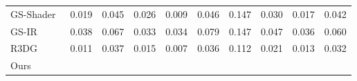 \begin{table*}
{\begin{tabular}{lccccccccc}
GS-Shader~\cite{jiang2024gaussianshader}    & 0.019                     & \cellcolor{yzythird}0.045                     & 0.026             &0.009                   & 0.046                         & 0.147                   & 0.030                      & 0.017    &  0.042                       \\

GS-IR~\cite{liang2024gs} & 0.038 & 0.067 & 0.033 & 0.034 & 0.079 & 0.147 & 0.047 & 0.036  & 0.060 \\

R3DG~\cite{gao2023relightable}    &  \cellcolor{yzysecond}0.011                    & \cellcolor{yzybest}0.037                    &   \cellcolor{yzysecond}0.015                 &  \cellcolor{yzysecond}0.007                  &   \cellcolor{yzybest}0.036                      &  \cellcolor{yzysecond}0.112                   &    \cellcolor{yzybest}0.021                  &  \cellcolor{yzythird}0.013  &  \cellcolor{yzysecond}0.032                                                                                                                                                                                                                                                                     \\

Ours & \cellcolor{yzybest}{0.010}                          & \cellcolor{yzybest}{0.037}                   & \cellcolor{yzybest}{0.014}                         & \cellcolor{yzybest}{0.006}         & \cellcolor{yzysecond}{0.037}               & \cellcolor{yzysecond}{0.112}                       & \cellcolor{yzysecond}{0.022}                           & \cellcolor{yzybest}{0.010}  &  \cellcolor{yzybest}{0.031}                                                                                                                                                                                        
 \\ \hline
\end{tabular}}
\label{tab:tab_nerfsynthetic}
\end{table*}